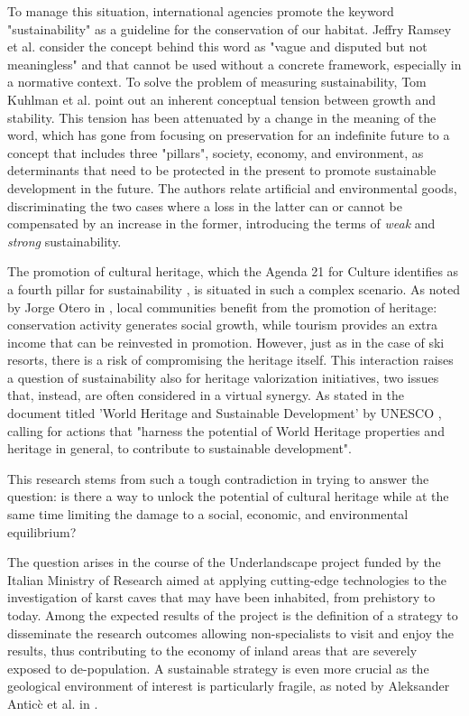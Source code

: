 \documentclass[sustainability,article,submit,pdftex,moreauthors]{Definitions/mdpi}
\begin{document}
To manage this situation, international agencies promote the keyword "sustainability" as a guideline for the conservation of our habitat. Jeffry Ramsey et al. \cite{ram15a} consider the concept behind this word as "vague and disputed but not meaningless" and that cannot be used without a concrete framework, especially in a normative context. To solve the problem of measuring sustainability, Tom Kuhlman et al. \cite{kuh10a} point out an inherent conceptual tension between growth and stability. This tension has been attenuated by a change in the meaning of the word, which has gone from focusing on preservation for an indefinite future to a concept that includes three "pillars", society, economy, and environment, as determinants that need to be protected in the present to promote sustainable development in the future. The authors relate artificial and environmental goods, discriminating the two cases where a loss in the latter can or cannot be compensated by an increase in the former, introducing the terms of {\em weak} and {\em strong} sustainability.

The promotion of cultural heritage, which the Agenda 21 for Culture identifies as a fourth pillar for sustainability \cite{fourthpillar}, is situated in such a complex scenario. As noted by Jorge Otero in \cite{ote22a}, local communities benefit from the promotion of heritage: conservation activity generates social growth, while tourism provides an extra income that can be reinvested in promotion. However, just as in the case of ski resorts, there is a risk of compromising the heritage itself. This interaction raises a question of sustainability also for heritage valorization initiatives, two issues that, instead,  are often considered in a virtual synergy. As stated in the document titled 'World Heritage and Sustainable Development' by UNESCO \cite{lab17a}, calling for actions that "harness the potential of World Heritage properties and heritage in general, to contribute to sustainable development".

This research stems from such a tough contradiction in trying to answer the question: is there a way to unlock the potential of cultural heritage while at the same time limiting the damage to a social, economic, and environmental equilibrium?

The question arises in the course of the Underlandscape project  funded by the Italian Ministry of Research aimed at applying cutting-edge technologies to the investigation of karst caves that may have been inhabited, from prehistory to today. Among the expected results of the project is the definition of a strategy to disseminate the research outcomes allowing non-specialists to visit and enjoy the results, thus contributing to the economy of inland areas that are severely exposed to de-population. A sustainable strategy is even more crucial as the geological environment of interest is particularly fragile, as noted by Aleksander Antic\`c et al. in \cite{ant20a}.
\end{document}
